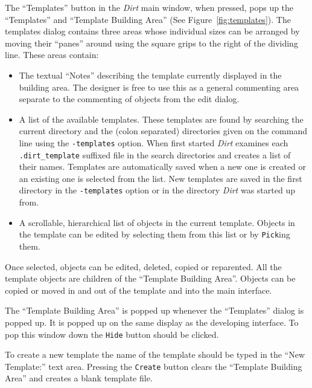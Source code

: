 The ``Templates'' button in the {\em Dirt} main window, when pressed, pops up
the ``Templates'' and ``Template Building Area'' (See
Figure~\ref{fig:templates}).  The templates dialog contains three areas whose
individual sizes can be arranged by moving their ``panes'' around using the
square grips to the right of the dividing line.  These areas contain:
\begin{itemize}
\item{}
The textual ``Notes'' describing the template currently displayed in the
building area.  The designer is free to use this as a general commenting area
separate to the commenting of objects from the edit dialog.
\item{}
A list of the available templates.  These templates are found by searching
the current directory and the (colon separated) directories given on the
command line using the {\tt -templates} option.  When first started
{\em Dirt} examines each {\tt .dirt\_template}
suffixed file in the search directories and
creates a list of their names.  Templates are automatically saved when a new
one is created or an existing one is selected from the list.  New templates
are saved in the first directory in the {\tt -templates} option or in the
directory {\em Dirt} was started up from.
\item{}
A scrollable, hierarchical list of objects in the current template.  Objects
in the template can be edited by selecting them from this list or by
{\tt Pick}ing them.
\end{itemize}
Once selected, objects can be edited, deleted, copied or reparented.  All the
template objects are children of the ``Template Building Area''.  Objects can
be copied or moved in and out of the template and into the main interface.

The ``Template Building Area'' is popped up whenever the ``Templates'' dialog
is popped up.  It is popped up on the same display as the developing
interface.  To pop this window down the {\tt Hide} button should be clicked.

To create a new template the name of the template should be typed in the
``New Template:'' text area.  Pressing the {\tt Create} button clears the
``Template Building Area'' and creates a blank template file.

